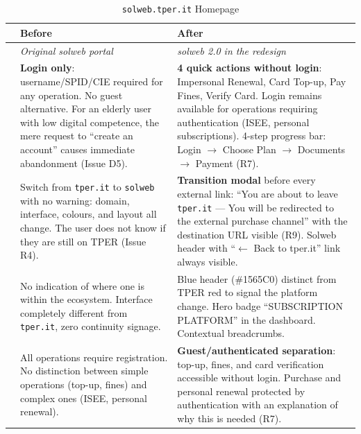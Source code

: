 \begin{table}[H]
\centering
\small
\renewcommand{\arraystretch}{1.4}
\begin{tabular}{|p{0.5cm}|p{7cm}|p{7cm}|}
\hline
& \textbf{Before} & \textbf{After} \\ \hline
\cellcolor{primaryColor!15} &
\textit{Original solweb portal} &
\textit{solweb 2.0 in the redesign} \\ \hline

\raisebox{0.5cm}{\rotatebox{90}{\textbf{Access}}} &
\textbf{Login only}: username/SPID/CIE required for any operation. No guest alternative. For an elderly user with low digital competence, the mere request to ``create an account'' causes immediate abandonment (Issue D5). &
\textbf{4 quick actions without login}: Impersonal Renewal, Card Top-up, Pay Fines, Verify Card. Login remains available for operations requiring authentication (ISEE, personal subscriptions). 4-step progress bar: Login $\rightarrow$ Choose Plan $\rightarrow$ Documents $\rightarrow$ Payment (R7). \\ \hline

\raisebox{0.5cm}{\rotatebox{90}{\textbf{Transition}}} &
Switch from \texttt{tper.it} to \texttt{solweb} with no warning: domain, interface, colours, and layout all change. The user does not know if they are still on TPER (Issue R4). &
\textbf{Transition modal} before every external link: ``You are about to leave \texttt{tper.it} --- You will be redirected to the external purchase channel'' with the destination URL visible (R9). Solweb header with ``$\leftarrow$ Back to tper.it'' link always visible. \\ \hline

\raisebox{0.5cm}{\rotatebox{90}{\textbf{Orientation}}} &
No indication of where one is within the ecosystem. Interface completely different from \texttt{tper.it}, zero continuity signage. &
Blue header (\#1565C0) distinct from TPER red to signal the platform change. Hero badge ``SUBSCRIPTION PLATFORM'' in the dashboard. Contextual breadcrumbs. \\ \hline

\raisebox{0.5cm}{\rotatebox{90}{\textbf{Operations}}} &
All operations require registration. No distinction between simple operations (top-up, fines) and complex ones (ISEE, personal renewal). &
\textbf{Guest/authenticated separation}: top-up, fines, and card verification accessible without login. Purchase and personal renewal protected by authentication with an explanation of why this is needed (R7). \\ \hline
\end{tabular}
\caption{\texttt{solweb.tper.it} Homepage}
\label{tab:comparison-solweb-home}
\end{table}

